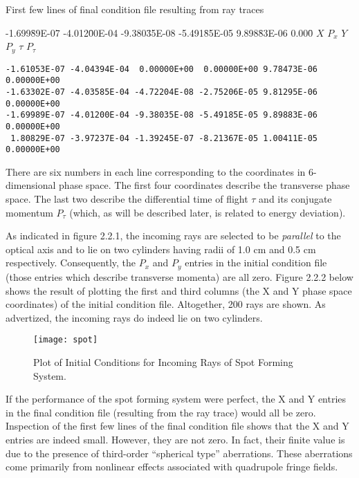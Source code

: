 First few lines of final condition file resulting from ray traces
\begin{footnotesize}
\begin{tt}
\begin{tabbing}
-1.699\=89E-07 -4.012\=00E-04 -9.380\=35E-08 -5.491\=85E-05 9.898\=83E-06 0.000\= \kill
\>$X$ \>$P_x$ \>$Y$ \>$P_y$ \>$\tau$ \>$P_{\tau}$
\end{tabbing}
\end{tt}
\vspace{-5mm}
\begin{verbatim}
-1.61053E-07 -4.04394E-04  0.00000E+00  0.00000E+00 9.78473E-06 0.00000E+00
-1.63302E-07 -4.03585E-04 -4.72204E-08 -2.75206E-05 9.81295E-06 0.00000E+00
-1.69989E-07 -4.01200E-04 -9.38035E-08 -5.49185E-05 9.89883E-06 0.00000E+00
 1.80829E-07 -3.97237E-04 -1.39245E-07 -8.21367E-05 1.00411E-05 0.00000E+00
\end{verbatim}
\end{footnotesize}

There are six numbers in each line corresponding to the coordinates in
6-dimensional phase space.  The first four coordinates describe the
transverse phase space.  The last two describe the differential time of
flight $\tau$ and its conjugate momentum $P_\tau$  (which, as will be described later,
is related to energy deviation).

As indicated in figure 2.2.1, the incoming rays are selected
to be {\em parallel} to the optical axis and to lie on two cylinders having radii of
1.0 cm and 0.5 cm respectively.  Consequently, the $P_x$  and $P_y$  entries in
the initial condition file (those entries which describe transverse momenta)
are all zero.  Figure 2.2.2 below shows the result of plotting the first and
third columns (the X and Y phase space coordinates) of the initial
condition file. Altogether, 200 rays are shown.  As advertized, the
incoming rays do indeed lie on two cylinders.

\begin{figure}[hbp]
  \centering
  \texttt{[image: spot]}
  \caption{Plot of Initial Conditions for Incoming Rays of Spot Forming System.}
\end{figure}

     If the performance of the spot forming system were perfect, the X and
Y entries in the final condition file (resulting from the ray trace) would
all be zero.  Inspection of the first few lines of the final condition file
shows that the X and Y entries are indeed small.  However, they are not
zero.  In fact, their finite value is due to the presence of third-order
``spherical type'' aberrations.  These aberrations come primarily from
nonlinear effects associated with quadrupole fringe fields.

